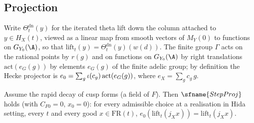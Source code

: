 \subsection{Projection}\label{sec:pf:rowprops:proj}

Write $\Theta^{\mathrm{dn}}_t(y)$ for the iterated theta lift down the column attached to $y\in H_X(t)$, viewed as a
linear map from smooth vectors of $M_Y(0)$ to functions on $G_{Y_0}(\A)$, so that $\mathrm{lift}_t(y)=\Theta^{\mathrm{dn}}_t(y)(w(d))$.
The finite group $\Gamma$ acts on the rational points by $r(g)$ and on functions on $G_{Y_0}(\A)$ by right translations
$\mathrm{act}(e_G(g))$ by elements $e_G(g)$ of the finite adelic group; by definition the Hecke projector is
$e_0=\sum_g\iota(c_g)\,\mathrm{act}(e_G(g))$, where $e_X=\sum_gc_g\,g$.

\begin{proposition}[Projection]\label{pf:rowprops:proj}
Assume the rapid decay of cusp forms (a field of $F$). Then $\sfname{StepProj}$ holds (with $C_{F0}=0$, $x_0=0$): for
every admissible choice at a realisation in Hida setting, every $t$ and every good $x\in\mathrm{FR}(t)$,
$e_0(\mathrm{lift}_t(j_Xx))=\mathrm{lift}_t(j_Xx)$.
\end{proposition}

